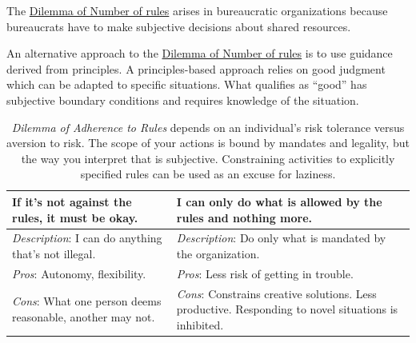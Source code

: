 The \hyperref[table:dilemma-personal-number-of-rules]{Dilemma of Number of rules}
arises in bureaucratic organizations because bureaucrats have to make subjective decisions about shared resources. 


An alternative approach to the  \hyperref[table:dilemma-personal-number-of-rules]{Dilemma of Number of rules}
is to use guidance derived from principles. A principles-based approach relies on good judgment which can be adapted to specific situations. What qualifies as ``good'' has subjective boundary conditions and requires knowledge of the situation.



\begin{center}
\begin{table}[H] %
\begin{tabular}{ | m{\dilemmatablewidth}| m{\dilemmatablewidth} | } 
  \hline
  \textbf{If it's not against the rules, it must be okay.} & 
  \textbf{I can only do what is allowed by the rules and nothing more.} \\ 
  \hline
  \textit{Description}: I can do anything that's not illegal. &
  \textit{Description}: Do only what is mandated by the organization. \\
  \hline
  \textit{Pros}: Autonomy, flexibility. &
  \textit{Pros}: Less risk of getting in trouble. \\
  \hline
  \textit{Cons}: What one person deems reasonable, another may not. & 
  \textit{Cons}: Constrains creative solutions. Less productive. Responding to novel situations is inhibited. \\  
  \hline
\end{tabular}
\caption{
\textit{Dilemma of Adherence to Rules} depends on an individual's risk tolerance versus aversion to risk. 
The scope of your actions is bound by mandates and legality, but the way you interpret that is subjective. 
Constraining activities to explicitly specified rules can be used as an excuse for laziness. 
}
\label{table:dilemma-personal-rule-adherence}
\end{table}
\end{center}

